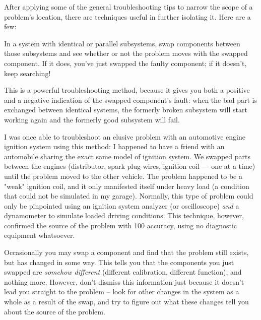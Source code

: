 \stopsubsection

\stopsection

\startsection[title={Specific Troubleshooting
Techniques},reference={sec:xtocid15790977}]

After applying some of the general troubleshooting tips to narrow the
scope of a problem's location, there are techniques useful in further
isolating it. Here are a few:

\startsubsection[title={Swap Identical
Components},reference={sec:xtocid15790978}]

In a system with identical or parallel subsystems, swap components
between those subsystems and see whether or not the problem moves with
the swapped component. If it does, you've just swapped the faulty
component; if it doesn't, keep searching!

This is a powerful troubleshooting method, because it gives you both a
positive and a negative indication of the swapped component's fault:
when the bad part is exchanged between identical systems, the formerly
broken subsystem will start working again and the formerly good
subsystem will fail.

I was once able to troubleshoot an elusive problem with an automotive
engine ignition system using this method: I happened to have a friend
with an automobile sharing the exact same model of ignition system. We
swapped parts between the engines (distributor, spark plug wires,
ignition coil --- one at a time) until the problem moved to the other
vehicle. The problem happened to be a "weak" ignition coil, and it only
manifested itself under heavy load (a condition that could not be
simulated in my garage). Normally, this type of problem could only be
pinpointed using an ignition system analyzer (or oscilloscope) {\em and}
a dynamometer to simulate loaded driving conditions. This technique,
however, confirmed the source of the problem with 100
accuracy, using no diagnostic equipment whatsoever.

Occasionally you may swap a component and find that the problem still
exists, but has changed in some way. This tells you that the components
you just swapped are {\em somehow different} (different calibration,
different function), and nothing more. However, don't dismiss this
information just because it doesn't lead you straight to the problem --
look for other changes in the system as a whole as a result of the swap,
and try to figure out what these changes tell you about the source of
the problem.

